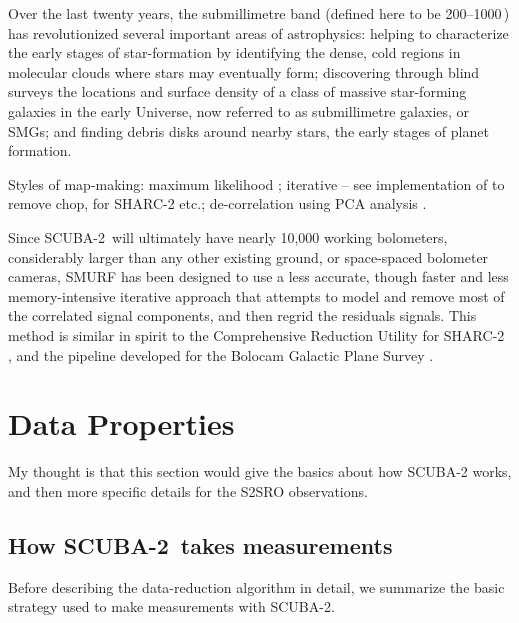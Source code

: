 \documentclass[useAMS,usenatbib,nofootinbib]{mn2e}
\newcommand{\scuba}{SCUBA-2}
\begin{document}
Over the last twenty years, the submillimetre band (defined here to be
200--1000\,\micron) has revolutionized several important areas of
astrophysics: helping to characterize the early stages of
star-formation by identifying the dense, cold regions in molecular
clouds where stars may eventually form; discovering through blind
surveys the locations and surface density of a class of massive
star-forming galaxies in the early Universe, now referred to as
submillimetre galaxies, or SMGs; and finding debris disks around
nearby stars, the early stages of planet formation.

Styles of map-making: maximum likelihood
\citep[e.g.,][]{patanchon2008}; iterative -- see \citet{johnstone2000}
implementation of \citet{wright1996} to remove chop,
\citet{kovacs2008} for SHARC-2 etc.; de-correlation using PCA analysis
\citep[e.g.][]{laurent2005,scott2008,aguirre2010}.

Since \scuba\ will ultimately have nearly 10,000 working bolometers,
considerably larger than any other existing ground, or space-spaced
bolometer cameras, SMURF has been designed to use a less accurate,
though faster and less memory-intensive iterative approach that
attempts to model and remove most of the correlated signal components,
and then regrid the residuals signals. This method is similar in
spirit to the Comprehensive Reduction Utility for SHARC-2
\citep[CRUSH,][]{kovacs2008}, and the pipeline developed for the
Bolocam Galactic Plane Survey \citep{aguirre2010}.

\section{Data Properties}
\label{sec:data}

My thought is that this section would give the basics about how
SCUBA-2 works, and then more specific details for the S2SRO
observations.

\subsection{How \scuba\ takes measurements}

Before describing the data-reduction algorithm in detail, we summarize
the basic strategy used to make measurements with SCUBA-2.
\end{document}
